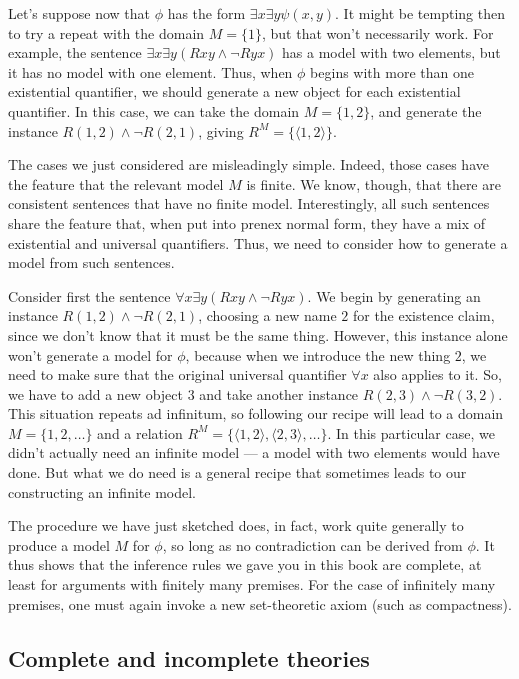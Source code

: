 Let's suppose now that $\phi$ has the form
$\exists x\exists y\psi (x,y)$.  It might be tempting then to try a
repeat with the domain $M=\{ 1\}$, but that won't necessarily work.
For example, the sentence $\exists x\exists y(Rxy\wedge\neg Ryx)$ has
a model with two elements, but it has no model with one element.
Thus, when $\phi$ begins with more than one existential quantifier, we
should generate a new object for each existential quantifier.  In this
case, we can take the domain $M=\{ 1,2\}$, and generate the instance
$R(1,2)\wedge \neg R(2,1)$, giving $R^M=\{ \langle 1,2\rangle \}$.

The cases we just considered are misleadingly simple.  Indeed, those
cases have the feature that the relevant model $M$ is finite.  We
know, though, that there are consistent sentences that have no finite
model.  Interestingly, all such sentences share the feature that, when
put into prenex normal form, they have a mix of existential and
universal quantifiers.  Thus, we need to consider how to generate a
model from such sentences.

Consider first the sentence $\forall x\exists y(Rxy\wedge\neg Ryx)$.
We begin by generating an instance $R(1,2)\wedge \neg R(2,1)$,
choosing a new name $2$ for the existence claim, since we don't know
that it must be the same thing.  However, this instance alone won't
generate a model for $\phi$, because when we introduce the new thing
$2$, we need to make sure that the original universal quantifier
$\forall x$ also applies to it.  So, we have to add a new object $3$
and take another instance $R(2,3)\wedge\neg R(3,2)$.  This situation
repeats ad infinitum, so following our recipe will lead to a domain
$M=\{ 1,2,\dots \}$ and a relation
$R^M=\{ \langle 1,2\rangle ,\langle 2,3\rangle ,\dots \}$.  In this
particular case, we didn't actually need an infinite model --- a model
with two elements would have done.  But what we do need is a general
recipe that sometimes leads to our constructing an infinite model.

The procedure we have just sketched does, in fact, work quite
generally to produce a model $M$ for $\phi$, so long as no
contradiction can be derived from $\phi$.  It thus shows that the
inference rules we gave you in this book are \gls{complete}, at least
for arguments with finitely many premises.  For the case of infinitely
many premises, one must again invoke a new set-theoretic axiom (such
as compactness).

\subsection{Complete and incomplete theories}

